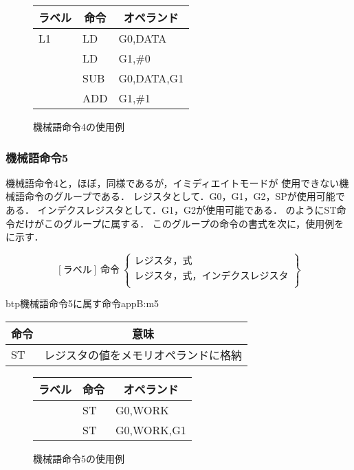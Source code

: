 \begin{figure}[btp]
\begin{center}
{\tt\small\begin{tabular}{|l|l|l|}\hline
\multicolumn{1}{|c|}{ラベル} & 
        \multicolumn{1}{c|}{命令} & \multicolumn{1}{c|}{オペランド} \\\hline
L1  & LD  & G0,DATA \\
    & LD  & G1,\#0 \\
    & SUB & G0,DATA,G1 \\
    & ADD & G1,\#1 \\\hline
\end{tabular}}
\caption{機械語命令4の使用例}
\label{fig:appB:m4ex}
\end{center}
\end{figure}

\subsubsection{機械語命令5}
機械語命令4と，ほぼ，同様であるが，イミディエイトモードが
使用できない機械語命令のグループである．
レジスタとして．G0，G1，G2，SPが使用可能である．
インデクスレジスタとして．G1，G2が使用可能である．
のようにST命令だけがこのグループに属する．
このグループの命令の書式を次に，使用例をに示す．

{\small\[ %
[ラベル]~命令~\left\{
  \begin{array}{c}
   レジスタ，式 \\
   レジスタ，式，インデクスレジスタ \\
  \end{array}  
 \right\}
 \]}

\begin{mytable}{btp}{機械語命令5に属す命令}{appB:m5}
{\small\begin{tabular}{l|l}
\hline\hline
\multicolumn{1}{c|}{命令} & \multicolumn{1}{c}{意味} \\\hline
ST & レジスタの値をメモリオペランドに格納
\end{tabular}}
\end{mytable}

\begin{figure}[btp]
\begin{center}
{\tt\small\begin{tabular}{|l|l|l|}\hline
\multicolumn{1}{|c|}{ラベル} & 
        \multicolumn{1}{c|}{命令} & \multicolumn{1}{c|}{オペランド} \\\hline
  & ST & G0,WORK \\
  & ST & G0,WORK,G1 \\\hline
\end{tabular}}
\caption{機械語命令5の使用例}
\label{fig:appB:m5ex}
\end{center}
\end{figure}

